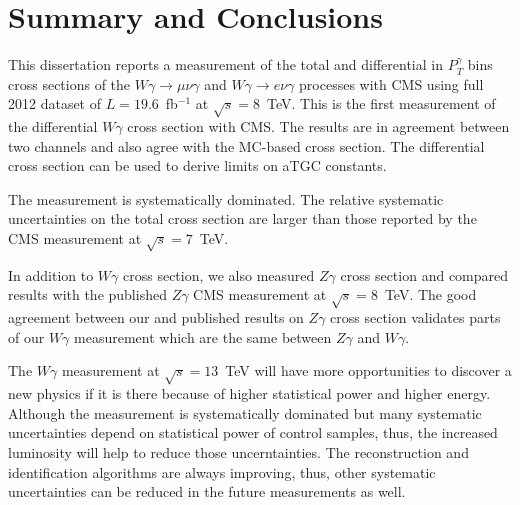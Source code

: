\chapter{Summary and Conclusions}
\label{sec:Conclusions}

This dissertation reports a measurement of the total and differential in $P_T^{\gamma}$ bins cross sections of the $W\gamma\rightarrow\mu\nu\gamma$ and $W\gamma\rightarrow e\nu\gamma$ processes with CMS using full 2012 dataset of $L=19.6$~fb$^{-1}$ at $\sqrt{s}=8$~TeV. This is the first measurement of the differential $W\gamma$ cross section with CMS. The results are in agreement between two channels and also agree with the MC-based cross section. The differential cross section can be used to derive limits on aTGC constants.

The measurement is systematically dominated. The relative systematic uncertainties on the total cross section are larger than those reported by the CMS measurement at $\sqrt{s}=7$~TeV. 

In addition to $W\gamma$ cross section, we also measured $Z\gamma$ cross section and compared results with the published $Z\gamma$ CMS measurement at $\sqrt{s}=8$~TeV. The good agreement between our and published results on $Z\gamma$ cross section validates parts of our $W\gamma$ measurement which are the same between $Z\gamma$ and $W\gamma$.

The $W\gamma$ measurement at $\sqrt{s}=13$~TeV will have more opportunities to discover a new physics if it is there because of higher statistical power and higher energy. Although the measurement is systematically dominated but many systematic uncertainties depend on statistical power of control samples, thus, the increased luminosity will help to reduce those uncerntainties. The reconstruction and identification algorithms are always improving, thus, other systematic uncertainties can be reduced in the future measurements as well.

